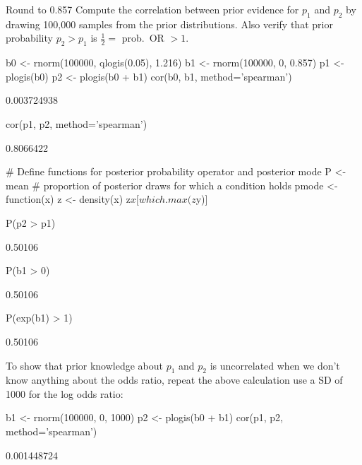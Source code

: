 \item Round to 0.857
\ei
Compute the correlation between prior evidence for $p_1$ and $p_2$ by drawing 100,000 samples from the prior distributions.  Also verify that prior probability $p_2 > p_1$ is $\frac{1}{2} =$ prob.\ OR $> 1$.
\begin{Schunk}
\begin{Sinput}
b0 <- rnorm(100000, qlogis(0.05), 1.216)
b1 <- rnorm(100000, 0, 0.857)
p1 <- plogis(b0)
p2 <- plogis(b0 + b1)
cor(b0, b1, method='spearman')
\end{Sinput}
\begin{Soutput}
[1] 0.003724938
\end{Soutput}
\begin{Sinput}
cor(p1, p2, method='spearman')
\end{Sinput}
\begin{Soutput}
[1] 0.8066422
\end{Soutput}
\begin{Sinput}
# Define functions for posterior probability operator and posterior mode
P <- mean   # proportion of posterior draws for which a condition holds
pmode <- function(x) {
  z <- density(x)
  z$x[which.max(z$y)]
  }

P(p2 > p1)
\end{Sinput}
\begin{Soutput}
[1] 0.50106
\end{Soutput}
\begin{Sinput}
P(b1 > 0)
\end{Sinput}
\begin{Soutput}
[1] 0.50106
\end{Soutput}
\begin{Sinput}
P(exp(b1) > 1)
\end{Sinput}
\begin{Soutput}
[1] 0.50106
\end{Soutput}
\end{Schunk}

To show that prior knowledge about $p_1$ and $p_2$ is uncorrelated when we don't know anything about the odds ratio, repeat the above calculation use a SD of 1000 for the log odds ratio:
\begin{Schunk}
\begin{Sinput}
b1 <- rnorm(100000, 0, 1000)
p2 <- plogis(b0 + b1)
cor(p1, p2, method='spearman')
\end{Sinput}
\begin{Soutput}
[1] 0.001448724
\end{Soutput}
\end{Schunk}

